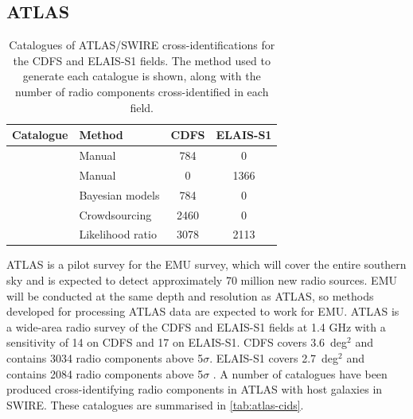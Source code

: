 \documentclass[fleqn,usenatbib,usedcolumn]{mnras}
\newcommand{\jansky}{\text{Jy}}
\begin{document}
  \subsection{ATLAS}\label{sec:atlas}
    \begin{table}
      \caption{Catalogues of ATLAS/SWIRE cross-identifications for the CDFS
        and ELAIS-S1 fields. The method used to generate each catalogue is
        shown, along with the number of radio components cross-identified in each
        field.}
      \label{tab:atlas-cids}
      \begin{tabular}{llcc}
        \hline
        Catalogue & Method & CDFS & ELAIS-S1\\
        \hline
        \citet{norris06} & Manual & 784 & 0\\
        \citet{middelberg08} & Manual & 0 & 1366\\
        \citet{fan15} & Bayesian models & 784 & 0\\
        \citet{wong17} & Crowdsourcing & 2460 & 0 \\
        \citet{weston17} & Likelihood ratio & 3078 & 2113\\
        \hline
      \end{tabular}
    \end{table}

ATLAS is a pilot survey for the EMU \citep{norris11} survey, which will
    cover the entire southern sky and is expected to detect approximately 70
    million new radio sources. EMU will be conducted at the same depth and
    resolution as ATLAS, so methods developed for processing ATLAS data are
    expected to work for EMU.    ATLAS is a wide-area radio survey of the CDFS and ELAIS-S1
    fields at 1.4 GHz with a sensitivity of
    \unit{14}{\micro\jansky} on CDFS and \unit{17}{\micro\jansky} on ELAIS-S1.
    CDFS covers 3.6~deg$^2$ and contains 3034 radio components above 5$\sigma$.
    ELAIS-S1 covers 2.7~deg$^2$ and contains 2084 radio components above
    5$\sigma$ \citep{franzen15}.  A number of catalogues have been produced cross-identifying radio components
    in ATLAS with host galaxies in SWIRE. These catalogues are summarised in
    \autoref{tab:atlas-cids}.




\end{document}
